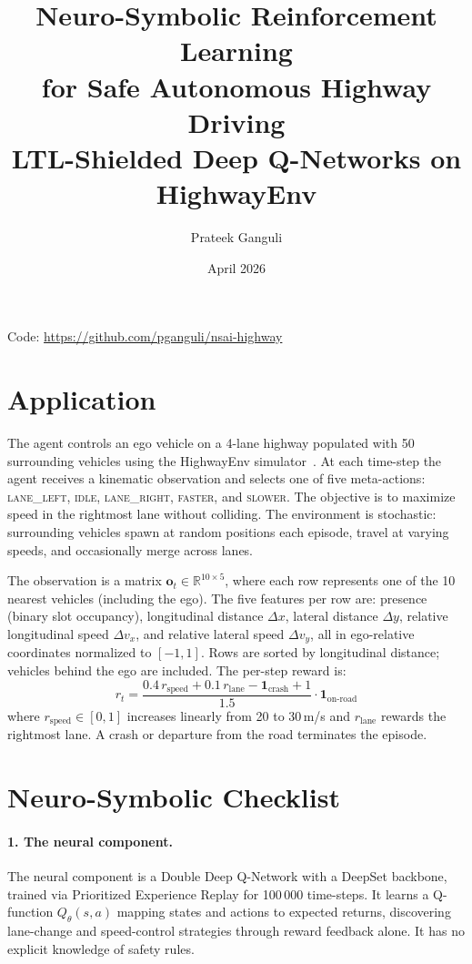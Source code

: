 \documentclass[11pt,a4paper]{article}
\title{\textbf{Neuro-Symbolic Reinforcement Learning\\for Safe Autonomous Highway Driving}\\[6pt]
\large LTL-Shielded Deep Q-Networks on HighwayEnv}
\author{Prateek Ganguli}
\date{April 2026}
\begin{document}
\maketitle

\noindent
Code: \url{https://github.com/pganguli/nsai-highway}

\section{Application}

The agent controls an ego vehicle on a 4-lane highway populated with 50 surrounding vehicles using the HighwayEnv simulator~\cite{leurent2018}. At each time-step the agent receives a kinematic observation and selects one of five meta-actions: \textsc{lane\_left}, \textsc{idle}, \textsc{lane\_right}, \textsc{faster}, and \textsc{slower}. The objective is to maximize speed in the rightmost lane without colliding. The environment is stochastic: surrounding vehicles spawn at random positions each episode, travel at varying speeds, and occasionally merge across lanes.

The observation is a matrix \(\mathbf{o}_t \in \mathbb{R}^{10 \times 5}\), where each row represents one of the 10 nearest vehicles (including the ego). The five features per row are: presence (binary slot occupancy), longitudinal distance \(\Delta x\), lateral distance \(\Delta y\), relative longitudinal speed \(\Delta v_x\), and relative lateral speed \(\Delta v_y\), all in ego-relative coordinates normalized to \([-1, 1]\). Rows are sorted by longitudinal distance; vehicles behind the ego are included. The per-step reward is:
\[
  r_t = \frac{0.4\,r_\text{speed} + 0.1\,r_\text{lane} - \mathbf{1}_\text{crash} + 1}{1.5}
  \cdot \mathbf{1}_\text{on-road}
\]
where \(r_\text{speed} \in [0,1]\) increases linearly from 20 to 30\,m/s and \(r_\text{lane}\) rewards the rightmost lane. A crash or departure from the road terminates the episode.

\section{Neuro-Symbolic Checklist}

\paragraph{1. The neural component.}
The neural component is a Double Deep Q-Network with a DeepSet backbone, trained via Prioritized Experience Replay for 100\,000 time-steps. It learns a Q-function \(Q_\theta(s, a)\) mapping states and actions to expected returns, discovering lane-change and speed-control strategies through reward feedback alone. It has no explicit knowledge of safety rules.
\end{document}
